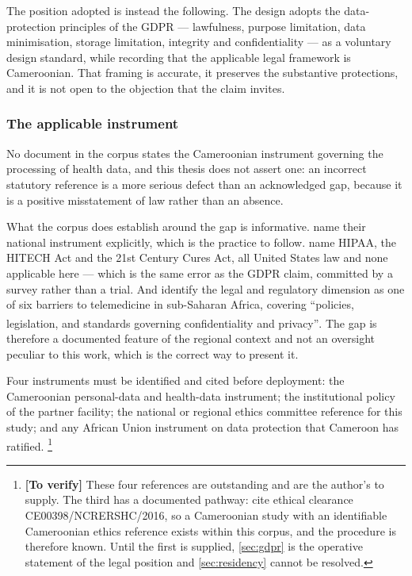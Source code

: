 \documentclass[12pt,a4paper,oneside]{report}
\newcommand{\verify}[1]{\footnote{\textbf{[To verify]} #1}}
\newcommand{\bq}[1]{``#1''\textsuperscript{\dag}}
\begin{document}
The position adopted is instead the following. The design adopts the data-protection principles of the GDPR --- lawfulness, purpose limitation, data minimisation, storage limitation, integrity and confidentiality --- as a voluntary design standard, while recording that the applicable legal framework is Cameroonian. That framing is accurate, it preserves the substantive protections, and it is not open to the objection that the claim invites.

\subsubsection{The applicable instrument}\label{sec:applicable-law}

No document in the corpus states the Cameroonian instrument governing the processing of health data, and this thesis does not assert one: an incorrect statutory reference is a more serious defect than an acknowledged gap, because it is a positive misstatement of law rather than an absence.

What the corpus does establish around the gap is informative. \Textcite{mucchi2021} name their national instrument explicitly, which is the practice to follow. \Textcite{liu2025review} name HIPAA, the HITECH Act and the 21st Century Cures Act, all United States law and none applicable here --- which is the same error as the GDPR claim, committed by a survey rather than a trial. And \textcite{dodoo2022} identify the legal and regulatory dimension as one of six barriers to telemedicine in sub-Saharan Africa, covering \bq{policies, legislation, and standards governing confidentiality and privacy}. The gap is therefore a documented feature of the regional context and not an oversight peculiar to this work, which is the correct way to present it.

Four instruments must be identified and cited before deployment: the Cameroonian personal-data and health-data instrument; the institutional policy of the partner facility; the national or regional ethics committee reference for this study; and any African Union instrument on data protection that Cameroon has ratified.%
\verify{These four references are outstanding and are the author's to supply. The third has a documented pathway: \textcite{bediang2021} cite ethical clearance CE00398/N\textdegree CRERSHC/2016, so a Cameroonian study with an identifiable Cameroonian ethics reference exists within this corpus, and the procedure is therefore known. Until the first is supplied, \cref{sec:gdpr} is the operative statement of the legal position and \cref{sec:residency} cannot be resolved.}
\end{document}
